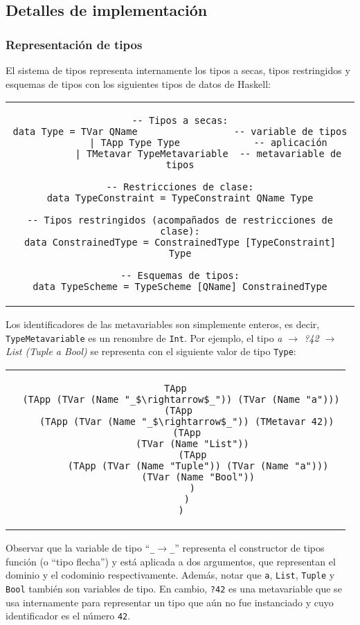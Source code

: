 \subsection{Detalles de implementación}

\subsubsection{Representación de tipos}

El sistema de tipos representa internamente
los tipos a secas, tipos restringidos y esquemas de tipos
con los siguientes tipos de datos de Haskell:

\begin{center}
\begin{tabular}{c}
\begin{lstlisting}[mathescape=true]
-- Tipos a secas:
data Type = TVar QName                 -- variable de tipos
          | TApp Type Type             -- aplicación
          | TMetavar TypeMetavariable  -- metavariable de tipos

-- Restricciones de clase:
data TypeConstraint = TypeConstraint QName Type

-- Tipos restringidos (acompañados de restricciones de clase):
data ConstrainedType = ConstrainedType [TypeConstraint] Type

-- Esquemas de tipos:
data TypeScheme = TypeScheme [QName] ConstrainedType
\end{lstlisting}
\end{tabular}
\end{center}

Los identificadores de las metavariables son simplemente enteros,
es decir, \verb|TypeMetavariable| es un renombre de \verb|Int|.
Por ejemplo, el tipo
  {\em a $\rightarrow$ ?42 $\rightarrow$  List (Tuple a Bool)}
se representa con el siguiente valor de tipo \verb|Type|:
\begin{center}
\begin{tabular}{c}
\begin{lstlisting}[mathescape=true]
TApp
  (TApp (TVar (Name "_$\rightarrow$_")) (TVar (Name "a")))
  (TApp 
    (TApp (TVar (Name "_$\rightarrow$_")) (TMetavar 42))
    (TApp
      (TVar (Name "List"))
      (TApp
        (TApp (TVar (Name "Tuple")) (TVar (Name "a")))
        (TVar (Name "Bool"))
      )
    )
  )
\end{lstlisting}
\end{tabular}
\end{center}
Observar que la variable de tipo ``\texttt{\_$\rightarrow$\_}''
representa el constructor de tipos función (o ``tipo flecha'')
y está aplicada a dos argumentos, que representan el dominio y el codominio
respectivamente.
Además, notar que \verb|a|, \verb|List|, \verb|Tuple| y \verb|Bool| también son variables de tipo.
En cambio, \verb|?42| es una metavariable que se usa internamente para representar un
tipo que aún no fue instanciado y cuyo identificador es el número \verb|42|.

